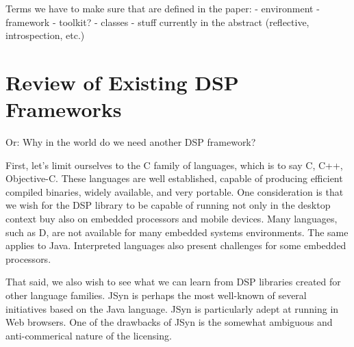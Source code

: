\documentclass[twoside,10pt]{article}
\begin{document}




Terms we have to make sure that are defined in the paper:
- environment
- framework
- toolkit?
- classes 
- stuff currently in the abstract (reflective, introspection, etc.)



\section{Review of Existing DSP Frameworks} %

Or: Why in the world do we need another DSP framework?

%

First, let's limit ourselves to the C family of languages, which is to say C, C++, Objective-C.  These languages are well established, capable of producing efficient compiled binaries, widely available, and very portable.  One consideration is that we wish for the DSP library to be capable of running not only in the desktop context buy also on embedded processors and mobile devices.  Many languages, such as D, are not available for many embedded systems environments.  The same applies to Java.  Interpreted languages also present challenges for some embedded processors.

That said, we also wish to see what we can learn from DSP libraries created for other language families.  JSyn is perhaps the most well-known of several initiatives based on the Java language\cite{Guillemard:2005, Burk:1998}.  JSyn is particularly adept at running in Web browsers.  One of the drawbacks of JSyn is the somewhat ambiguous and anti-commerical nature of the licensing.
\end{document}
